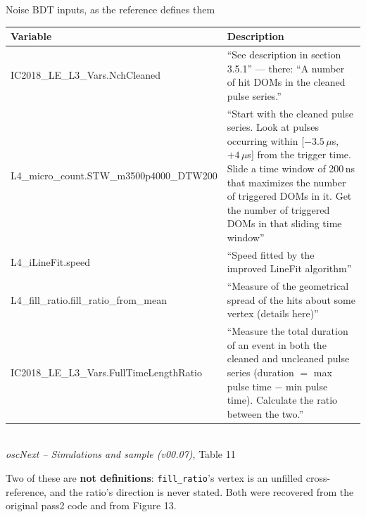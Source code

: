 \documentclass[aspectratio=169,10pt]{beamer}
\newcommand{\notetitle}{oscNext -- Simulations and sample (v00.07)}
\newcommand{\notecite}[1]{{\tiny\color{gray}\textit{\notetitle}, #1}}
\begin{document}
\begin{frame}{Noise BDT inputs, as the reference defines them}
  \centering\scriptsize
  \begin{tabular}{@{}>{\ttfamily\raggedright\arraybackslash}p{4.8cm}%
                    >{\raggedright\arraybackslash}p{8.7cm}@{}}
    \toprule
    \normalfont\textbf{Variable} & \textbf{Description} \\
    \midrule
    IC2018\_LE\_L3\_Vars.NchCleaned &
      ``See description in section 3.5.1'' --- there:
      ``A number of hit DOMs in the cleaned pulse series.'' \\[4pt]
    L4\_micro\_count.\allowbreak STW\_m3500p4000\_DTW200 &
      ``Start with the cleaned pulse series.  Look at pulses occurring within
      [$-3.5\,\mu$s, $+4\,\mu$s] from the trigger time.  Slide a time window
      of 200\,ns that maximizes the number of triggered DOMs in it.  Get the
      number of triggered DOMs in that sliding time window'' \\[4pt]
    L4\_iLineFit.speed &
      ``Speed fitted by the improved LineFit algorithm'' \\[4pt]
    L4\_fill\_ratio.\allowbreak fill\_ratio\_from\_mean &
      ``Measure of the geometrical spread of the hits about some vertex
      \textcolor{bad}{(details here)}'' \\[4pt]
    IC2018\_LE\_L3\_Vars.\allowbreak FullTimeLengthRatio &
      ``Measure the total duration of an event in both the cleaned and
      uncleaned pulse series (duration $=$ max pulse time $-$ min pulse
      time).  Calculate the ratio between the two.'' \\
    \bottomrule
  \end{tabular}\\[3pt]
  \notecite{Table 11}

  \medskip
  \footnotesize\raggedright
  Two of these are \textbf{not definitions}: \texttt{fill\_ratio}'s vertex is
  an unfilled cross-reference, and the ratio's direction is never stated.
  Both were recovered from the original pass2 code and from Figure 13.
\end{frame}
\end{document}
